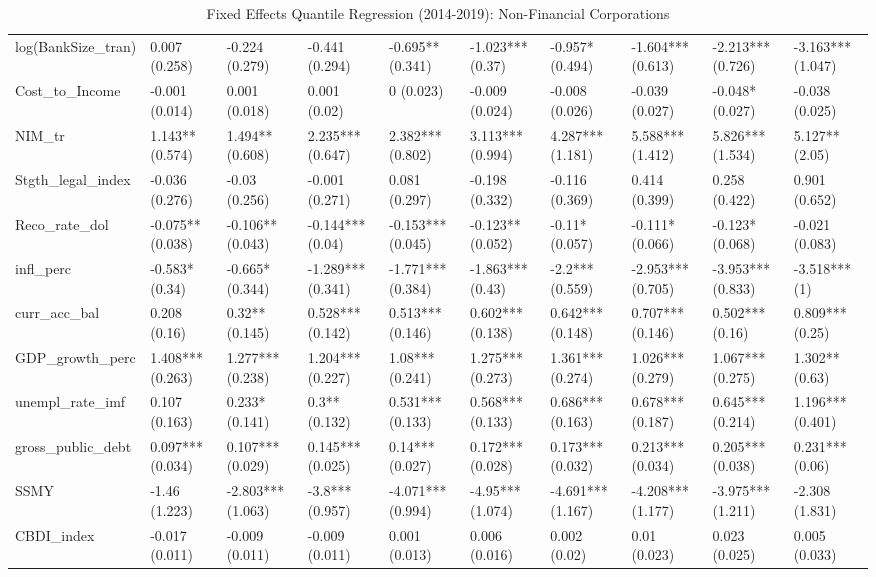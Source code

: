 \begin{table}[H]
\begin{subtable}[c]{\textwidth}
{\begin{tabular}{llllllllll}
  log(BankSize\_tran) & 0.007 (0.258) & -0.224 (0.279) & -0.441 (0.294) & -0.695** (0.341) & -1.023*** (0.37) & -0.957* (0.494) & -1.604*** (0.613) & -2.213*** (0.726) & -3.163*** (1.047) \\ 
  Cost\_to\_Income & -0.001 (0.014) & 0.001 (0.018) & 0.001 (0.02) & 0 (0.023) & -0.009 (0.024) & -0.008 (0.026) & -0.039 (0.027) & -0.048* (0.027) & -0.038 (0.025) \\ 
  NIM\_tr & 1.143** (0.574) & 1.494** (0.608) & 2.235*** (0.647) & 2.382*** (0.802) & 3.113*** (0.994) & 4.287*** (1.181) & 5.588*** (1.412) & 5.826*** (1.534) & 5.127** (2.05) \\ 
  Stgth\_legal\_index & -0.036 (0.276) & -0.03 (0.256) & -0.001 (0.271) & 0.081 (0.297) & -0.198 (0.332) & -0.116 (0.369) & 0.414 (0.399) & 0.258 (0.422) & 0.901 (0.652) \\ 
  Reco\_rate\_dol & -0.075** (0.038) & -0.106** (0.043) & -0.144*** (0.04) & -0.153*** (0.045) & -0.123** (0.052) & -0.11* (0.057) & -0.111* (0.066) & -0.123* (0.068) & -0.021 (0.083) \\ 
  infl\_perc & -0.583* (0.34) & -0.665* (0.344) & -1.289*** (0.341) & -1.771*** (0.384) & -1.863*** (0.43) & -2.2*** (0.559) & -2.953*** (0.705) & -3.953*** (0.833) & -3.518*** (1) \\ 
  curr\_acc\_bal & 0.208 (0.16) & 0.32** (0.145) & 0.528*** (0.142) & 0.513*** (0.146) & 0.602*** (0.138) & 0.642*** (0.148) & 0.707*** (0.146) & 0.502*** (0.16) & 0.809*** (0.25) \\ 
  GDP\_growth\_perc & 1.408*** (0.263) & 1.277*** (0.238) & 1.204*** (0.227) & 1.08*** (0.241) & 1.275*** (0.273) & 1.361*** (0.274) & 1.026*** (0.279) & 1.067*** (0.275) & 1.302** (0.63) \\ 
  unempl\_rate\_imf & 0.107 (0.163) & 0.233* (0.141) & 0.3** (0.132) & 0.531*** (0.133) & 0.568*** (0.133) & 0.686*** (0.163) & 0.678*** (0.187) & 0.645*** (0.214) & 1.196*** (0.401) \\ 
  gross\_public\_debt & 0.097*** (0.034) & 0.107*** (0.029) & 0.145*** (0.025) & 0.14*** (0.027) & 0.172*** (0.028) & 0.173*** (0.032) & 0.213*** (0.034) & 0.205*** (0.038) & 0.231*** (0.06) \\ 
  SSMY & -1.46 (1.223) & -2.803*** (1.063) & -3.8*** (0.957) & -4.071*** (0.994) & -4.95*** (1.074) & -4.691*** (1.167) & -4.208*** (1.177) & -3.975*** (1.211) & -2.308 (1.831) \\ 
  CBDI\_index & -0.017 (0.011) & -0.009 (0.011) & -0.009 (0.011) & 0.001 (0.013) & 0.006 (0.016) & 0.002 (0.02) & 0.01 (0.023) & 0.023 (0.025) & 0.005 (0.033) \\ 
   \bottomrule
\end{tabular}}
\end{subtable}

\caption{Fixed Effects Quantile Regression (2014-2019): Non-Financial Corporations} 
\label{qrfe_npl_nfi}
\end{table}
